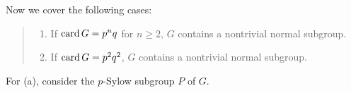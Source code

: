 \begin{solution}
  Now we cover the following cases:
  \begin{quote}
    \begin{claim*}
      \hfill
      \begin{enumerate}[label=\textnormal{(\alph*)}]
      \item If \(\operatorname{card} G=p^nq\) for \(n\geq 2\), \(G\) contains a
        nontrivial normal subgroup.
      \item If \(\operatorname{card} G=p^2q^2\), \(G\) contains a nontrivial normal
        subgroup.
      \end{enumerate}
    \end{claim*}
  \end{quote}
  \begin{subproof}
    For (a), consider the \(p\)-Sylow subgroup \(P\) of \(G\).
  \end{subproof}
\end{solution}

